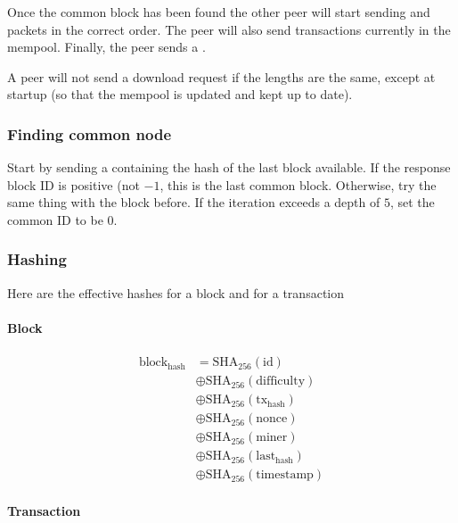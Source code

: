 \documentclass[../documentation.tex]{subfiles}
\begin{document}
Once the common block has been found the other peer will start sending
 and  packets in the correct order.
The peer will also send transactions currently in the mempool. Finally, the peer sends a
.

A peer will not send a download request if the lengths are the same, except
at startup (so that the mempool is updated and kept up to date).

\subsubsection{Finding common node}

Start by sending a  containing the hash of the last block
available. If the response block ID is positive (not \(-1\), this is the last common block.
Otherwise, try the same thing with the block before. If the iteration exceeds a depth of \(5\),
set the common ID to be 0.

\pagebreak

\subsubsection{Hashing}

Here are the effective hashes for a block and for a transaction

\paragraph{Block}

\begin{align*}
    \text{block}_\text{hash} &=
    \text{SHA}_{256}(\text{id}) \\
    &\oplus \text{SHA}_{256}(\text{difficulty}) \\
    &\oplus \text{SHA}_{256}(\text{tx}_\text{hash}) \\
    &\oplus \text{SHA}_{256}(\text{nonce}) \\
    &\oplus \text{SHA}_{256}(\text{miner}) \\
    &\oplus \text{SHA}_{256}(\text{last}_\text{hash}) \\
    &\oplus \text{SHA}_{256}(\text{timestamp})
\end{align*}

\paragraph{Transaction}
\end{document}
